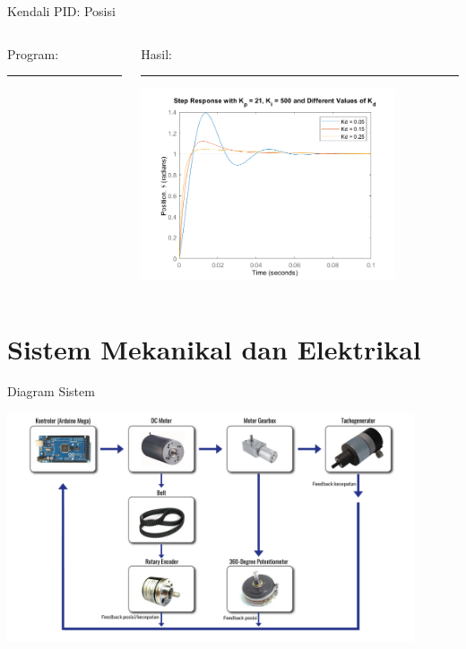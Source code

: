 \documentclass[10pt,xcolor={dvipsnames}]{beamer}
\begin{document}
		\begin{frame}{Kendali PID: Posisi}
			\begin{columns}[T] %
				\begin{column}{0.48\textwidth}
					Program:
					\color{black}\rule{\linewidth}{4pt}
					
				\end{column}%
				\hfill%
				\begin{column}{0.48\textwidth}
					Hasil:
					\color{blue}\rule{\linewidth}{4pt}
					\begin{center}
						\includegraphics[width=7.5cm]{Matlab/PIDpos.png}
					\end{center}
				\end{column}
			\end{columns}
		\end{frame}
		\section{Sistem Mekanikal dan Elektrikal}
		\begin{frame}{Diagram Sistem}
			\begin{center}
				\includegraphics[width=12cm]{Gambar Lain/diagram.png}
			\end{center}
		\end{frame}
	
\end{document}
